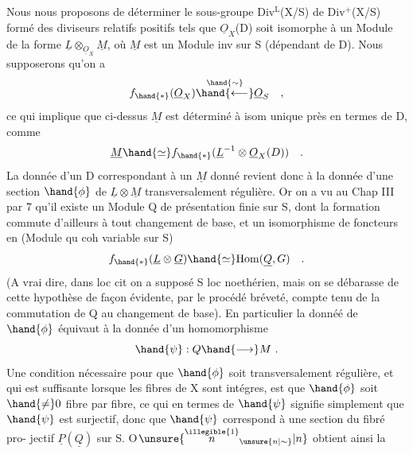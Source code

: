 
Nous nous proposons de déterminer le sous-groupe Div$^{\mathrm{L}}$(X/S) de Div$^{+}$(X/S)
formé des diviseurs relatifs positifs tels que $\underline{O}_X$(D) soit isomorphe à
un Module de la forme $\underline{L}\otimes_{\underline{O}_X}\underline{M}$, où $\underline{M}$ est un Module inv sur S (dépendant de
D). Nous supposerons qu'on a
\[ f_{\hand{*}}(\underline{O}_X)\overset{\hand{\sim}}{\hand{\longleftarrow}}\underline{O}_S \quad , \]
ce qui implique que ci-dessus $\underline{M}$ est déterminé à isom unique près en termes
de D, comme
\[ \underline{M}\hand{\simeq} f_{\hand{*}}(\underline{L}^{-1}\otimes\underline{O}_X(D)) \quad . \]
La donnée d'un D correspondant à un $\underline{M}$ donné revient donc à la donnée
d'une section $\hand{\phi}$ de $\underline{L}\otimes\underline{M}$ transversalement régulière. Or on a vu au
Chap III par 7  qu'il  existe un Module Q de
présentation finie sur S, dont la formation commute d'ailleurs à tout
changement de base, et un isomorphisme de foncteurs en  (Module qu coh
variable sur S)
\[ f_{\hand{*}}(\underline{L}\otimes\underline{G})\hand{\simeq} \mathrm{Hom}(\underline{Q},G) \quad . \]
(A vrai dire, dans loc cit on a supposé S loc noethérien, mais on se
débarasse de cette hypothèse de façon évidente, par le procédé bréveté,
compte tenu de la commutation de Q au changement de base). En particulier
la donnéé de $\hand{\phi}$ équivaut à  la donnée d'un homomorphisme
\[ \hand{\psi} : Q \hand{\longrightarrow} M \ . \]
Une condition nécessaire pour que $\hand{\phi}$ soit transversalement régulière, et
qui est suffisante lorsque les fibres de X sont intégres, est que $\hand{\phi}$ soit
$\hand{\neq} 0$  fibre par fibre, ce qui en termes de $\hand{\psi}$ signifie simplement que
$\hand{\psi}$ est surjectif, donc que  $\hand{\psi}$ correspond à une section du fibré pro-%
jectif $\underline{P}(\underline{Q})$ sur S. O$\unsure{\overset{\illegible{1}}{n}_{\unsure{n|\sim}}|n}$ obtient ainsi la

